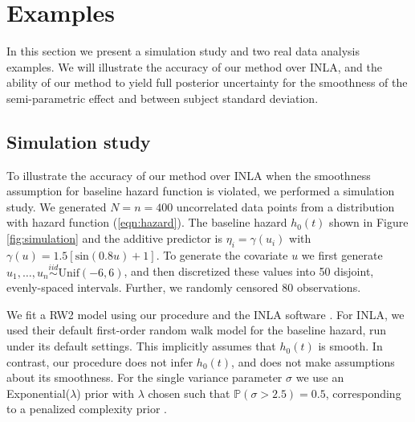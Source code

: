 \documentclass[]{article}
\begin{document}
\section{Examples}\label{sec:example}

In this section we present a simulation study and two real data analysis examples. We will illustrate the accuracy of our method over INLA, and the ability of our method to yield full posterior uncertainty for the smoothness of the semi-parametric effect and between subject standard deviation.

\subsection{Simulation study}

To illustrate the accuracy of our method over INLA when the smoothness assumption for baseline hazard function is violated, we performed a simulation study. We generated $N = n = 400$ uncorrelated data points from a distribution with hazard function (\ref{eqn:hazard}). The baseline hazard $h_{0}(t)$ shown in Figure \ref{fig:simulation} and the additive predictor is $\eta_{i} = \gamma\left(u_{i}\right)$ with $\gamma(u) = 1.5 [ \text{sin}(0.8u) + 1 ]$. To generate the covariate $u$ we first generate $u_{1},\ldots,u_{n}\overset{iid}{\sim}\text{Unif}(-6,6)$, and then discretized these values into 50 disjoint, evenly-spaced intervals. Further, we randomly censored $80$ observations. 

We fit a RW2 model using our procedure and the INLA software \citep{inla}. For INLA, we used their default first-order random walk model for the baseline hazard, run under its default settings. This implicitly assumes that $h_{0}(t)$ is smooth. In contrast, our procedure does not infer $h_{0}(t)$, and does not make assumptions about its smoothness. For the single variance parameter $\sigma$ we use an Exponential($\lambda$) prior with $\lambda$ chosen such that $\mathbb{P}\left( \sigma > 2.5\right) = 0.5$, corresponding to a penalized complexity prior \citep{pcprior}.
\end{document}
